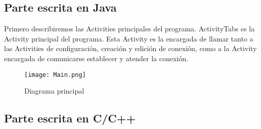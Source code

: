 \subsection{Parte escrita en Java}

Primero describiremos las Activities principales del programa. ActivityTabs es la Activity principal del programa. Esta Activity es la encargada de llamar tanto a las Activities de configuración, creación y edición de conexión, como a la Activity encargada de comunicarse establecer y atender la conexión.\\

\begin{figure}[h]
\begin{center}
\texttt{[image: Main.png]}
\end{center}
\caption{Diagrama principal}
\end{figure}

\subsection{Parte escrita en C/C++}


